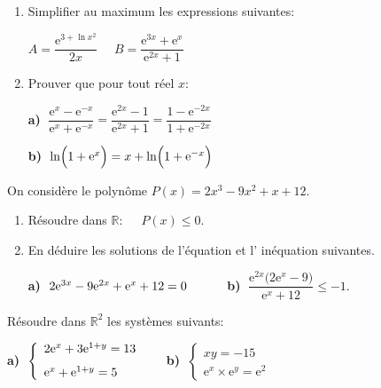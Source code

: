 



 
	
\begin{exercice}
\begin{enumerate}
\item Simplifier  au maximum les expressions suivantes:\medskip

 $A= \dfrac{\text{e}^{3+\ln x^{2}}}{2x} \quad $  $ B=\dfrac{\text{e}^{3x}+\text{e}^{x}}{\text{e}^{2x}+1}$ 
\item Prouver que pour tout réel $ x $:\medskip

  \textbf{a)} $\; \dfrac{\text{e}^{x}-\text{e}^{-x}}{\text{e}^{x}+\text{e}^{-x}}=\dfrac{\text{e}^{2x}-1}{\text{e}^{2x}+1}=\dfrac{1-\text{e}^{-2x}}{1+\text{e}^{-2x}}$ 

\medskip

 \textbf{b)} $\; \ln\Bigl(1+ \text{e}^{x}\Bigr)= x+\ln\Bigl(1+ \text{e}^{-x}\Bigr)$
\end{enumerate}
\end{exercice}

\begin{exercice}
On considère le polynôme $ P(x)=2x^{3}-9x^{2}+x+12$.
\begin{enumerate}
\item Résoudre dans $ \mathbb{R}:\quad $    $ P(x)\leq0 $.
\item En déduire les  solutions de l'équation et l' inéquation suivantes.

\medskip

\textbf{a)} $ \;2\text{e}^{3x}-9\text{e}^{2x}+\text{e}^{x}+12=0\hspace*{1cm} $ 
\textbf{b)} $\;\dfrac{\text{e}^{2x}\bigl(2\text{e}^{x}-9\bigr)}{\text{e}^{x}+12} \leq -1 $.
\end{enumerate}
\end{exercice}
\begin{exercice}
 Résoudre dans $ \mathbb{R}^{2} $  les systèmes suivants:

\medskip

\textbf{a)} $\; \left\{\begin{array}{l}  2\text{e}^{x} +3\text{e}^{1+y}=13 \\[0.25cm] \text{e}^{x}+\text{e}^{1+y}=5 \end{array}\right.\hspace*{0.5cm}$
\textbf{b)} $ \;  \left\{\begin{array}{l} xy=-15 \\[0.25cm]  \text{e}^{x}\times\text{e}^{y}=\text{e}^{2} \end{array}\right.$

\end{exercice}

